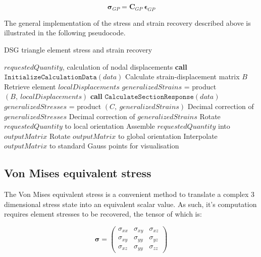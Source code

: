 \begin{equation} 
\boldsymbol{\sigma}_{GP} = \mathbf{C}_{GP}\ \boldsymbol{\epsilon}_{GP}
\label{eqt21}
\end{equation}

The general implementation of the stress and strain recovery described above is illustrated in the following pseudocode.

\begin{algorithm}
	\caption{DSG triangle element stress and strain recovery}
	\label{DSG triangle element stress and strain recovery}
	\begin{algorithmic}[1]
		\Require $requestedQuantity$, calculation of nodal displacements
		\State \textbf{call} $\texttt{InitializeCalculationData}(data)$
		\State \hspace{\algorithmicindent}Calculate strain-displacement matrix $B$
		\State \hspace{\algorithmicindent}Retrieve element $localDisplacements$
		\State $generalizedStrains$ = product$(B,\ localDisplacements)$
				\State \textbf{call} $\texttt{CalculateSectionResponse}(data)$
				\State $generalizedStresses$ = product $(C,\ generalizedStrains)$
				\State Decimal correction of $generalizedStresses$
		\EndIf
		\State Decimal correction of $generalizedStrains$ 
				\State Rotate $requestedQuantity$ to local orientation
		\EndIf
		\State Assemble $requestedQuantity$ into $outputMatrix$
				\State Rotate $outputMatrix$ to global orientation
		\EndIf
		\State Interpolate $outputMatrix$ to standard Gauss points for visualisation
	\end{algorithmic}
\end{algorithm}

\subsection{Von Mises equivalent stress}

The Von Mises equivalent stress is a convenient method to translate a complex 3 dimensional stress state into an equivalent scalar value. As such, it's computation requires element stresses to be recovered, the tensor of which is:

\begin{equation} 
\boldsymbol{\sigma} = 
\begin{pmatrix}
\sigma_{xx} & \sigma_{xy} & \sigma_{xz} \\
\sigma_{xy} & \sigma_{yy} & \sigma_{yz} \\
\sigma_{xz} & \sigma_{yy} & \sigma_{zz}
\end{pmatrix}
\label{eqt22}
\end{equation}


